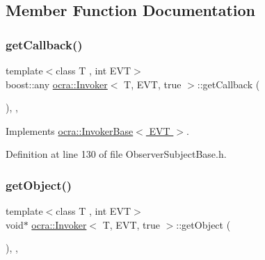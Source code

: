 \subsection{Member Function Documentation}
\hypertarget{classocra_1_1Invoker_3_01T_00_01EVT_00_01true_01_4_a902cb0e1084dc60929920a56631c8586}{}\label{classocra_1_1Invoker_3_01T_00_01EVT_00_01true_01_4_a902cb0e1084dc60929920a56631c8586} 
\subsubsection{\texorpdfstring{get\+Callback()}{getCallback()}}
{\footnotesize\ttfamily template$<$class T , int E\+VT$>$ \\
boost\+::any \hyperlink{classocra_1_1Invoker}{ocra\+::\+Invoker}$<$ T, E\+VT, true $>$\+::get\+Callback (\begin{DoxyParamCaption}{ }\end{DoxyParamCaption})\hspace{0.3cm}{\ttfamily [inline]}, {\ttfamily [protected]}, {\ttfamily [virtual]}}



Implements \hyperlink{classocra_1_1InvokerBase_aab9488dbb26120ccfa7c77be11c01ba9}{ocra\+::\+Invoker\+Base$<$ E\+V\+T $>$}.



Definition at line 130 of file Observer\+Subject\+Base.\+h.

\hypertarget{classocra_1_1Invoker_3_01T_00_01EVT_00_01true_01_4_ab187a80065f38c9a650e0a5b35185153}{}\label{classocra_1_1Invoker_3_01T_00_01EVT_00_01true_01_4_ab187a80065f38c9a650e0a5b35185153} 
\subsubsection{\texorpdfstring{get\+Object()}{getObject()}}
{\footnotesize\ttfamily template$<$class T , int E\+VT$>$ \\
void$\ast$ \hyperlink{classocra_1_1Invoker}{ocra\+::\+Invoker}$<$ T, E\+VT, true $>$\+::get\+Object (\begin{DoxyParamCaption}{ }\end{DoxyParamCaption})\hspace{0.3cm}{\ttfamily [inline]}, {\ttfamily [protected]}, {\ttfamily [virtual]}}



